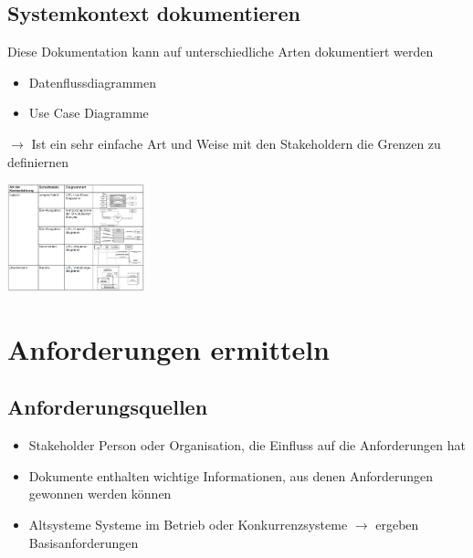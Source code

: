\documentclass{report}
\newenvironment{Figure}
	{\par\medskip\noindent\minipage{\linewidth}}
	{\endminipage\par\medskip}
\theoremstyle{definition}
\theoremstyle{example}
\begin{document}
\subsection{Systemkontext dokumentieren}
Diese Dokumentation kann auf unterschiedliche Arten dokumentiert werden
\begin{itemize}
   \item Datenflussdiagrammen
   \item Use Case Diagramme
\end{itemize}
$\rightarrow$ Ist ein sehr einfache Art und Weise mit den Stakeholdern die Grenzen zu definiernen

\begin{Figure}
   \centering
    \includegraphics[width=150px]{img/ArtenSystemkontextDoku.png}
        \label{fig:Arten der Dokumentation von Systemkontext}
\end{Figure}

\section{Anforderungen ermitteln}

\subsection{Anforderungsquellen}
\begin{itemize}
   \item Stakeholder
   \subitem Person oder Organisation, die Einfluss auf die Anforderungen hat 
   \item Dokumente
   \subitem enthalten wichtige Informationen, aus denen Anforderungen gewonnen werden können 
   \item Altsysteme
   \subitem Systeme im Betrieb oder Konkurrenzsysteme $\rightarrow$ ergeben Basisanforderungen 
\end{itemize}
\end{document}
